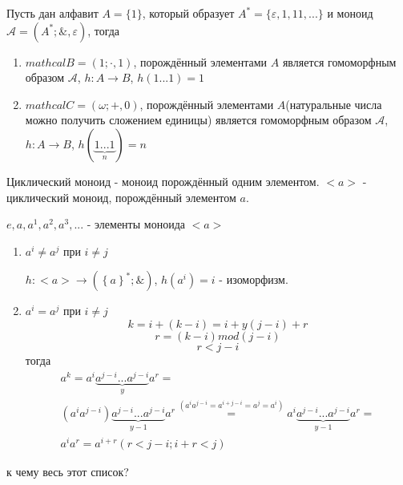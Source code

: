 \documentclass[../main/document.tex]{subfiles}
\begin{document}
\begin{exm}

Пусть дан алфавит $A=\{1\}$, который образует $A^*=\{\varepsilon,1,11,...\}$ и моноид $\mathcal{A}=(A^*;\&,\varepsilon)$, тогда
\begin{enumerate}
\item $mathcal{B}=({1};\cdot,1)$, порождённый элементами $A$ является гомоморфным образом $\mathcal{A}$, $h:A\rightarrow B$, $h(1...1)=1$
\item $mathcal{C}=(\omega;+,0)$, порождённый элементами $A$(натуральные числа можно получить сложением единицы) является гомоморфным образом $\mathcal{A}$, $h:A\rightarrow B$, $h(\underbrace{1...1}_n)=n$
\end{enumerate}
\end{exm}

\begin{dfn}
Циклический моноид - моноид порождённый одним элементом. $<a>$ - циклический моноид, порождённый элементом $a$. 

$e,a,a^1,a^2,a^3,...$ - элементы моноида $<a>$

\begin{enumerate}
\item $a^i\neq a^j$ при $i\neq j$

$h:<a>\rightarrow ({\left\{a\right\}}^*;\&)$, $h(a^i)=i$ - изоморфизм.
\item $a^i=a^j$ при $i\neq j$
$$k=i+(k-i)=i+y(j-i)+r$$
$$r=(k-i)mod(j-i)$$
$$r<j-i$$
тогда
\begin{multline*}
a^k=a^i\underbrace{a^{j-i}...a^{j-i}}_{y}a^r=\\
(a^ia^{j-i})\underbrace{a^{j-i}...a^{j-i}}_{y-1}a^r\stackrel{(a^ia^{j-i}=a^{i+j-i}=a^j=a^i)}{=}a^i\underbrace{a^{j-i}...a^{j-i}}_{y-1}a^r=\\
a^ia^r=a^{i+r} (r<j-i; i+r<j)
\end{multline*}
\end{enumerate}
к чему весь этот список?
\end{dfn}
\end{document}
